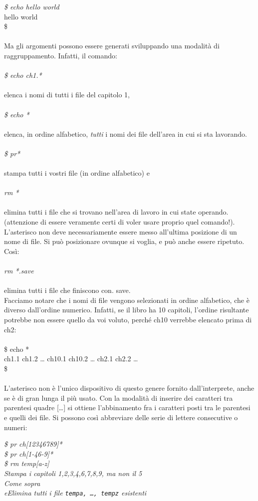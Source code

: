 {\it \$ echo hello world}\\
hello world\\
\$\\\\
Ma gli argomenti possono essere generati sviluppando una modalità di raggruppamento. Infatti, il comando:\\\\
{\it \$ echo ch1.*}\\\\
elenca i nomi di tutti i file del capitolo 1,\\\\
{\it \$ echo *}\\\\
elenca, in ordine alfabetico, {\it tutti} i nomi dei file dell'area in cui si sta lavorando.\\\\
{\it \$ pr*}\\\\
stampa tutti i vostri file (in ordine alfabetico) e\\\\
{\it rm *}\\\\
elimina tutti i file che si trovano nell'area di lavoro in cui state operando. (attenzione
di essere veramente certi di voler usare proprio quel comando!).\\
L'asterisco non deve necessariamente essere messo all'ultima posizione di un nome
di file. Si può posizionare ovunque si voglia, e può anche essere ripetuto. Così:\\\\
{\it rm *.save}\\\\
elimina tutti i file che finiscono con. save.\\
Facciamo notare che i nomi di file vengono selezionati in ordine alfabetico, che è
diverso dall'ordine numerico. Infatti, se il libro ha 10 capitoli, l'ordine risultante potrebbe non essere quello da voi voluto, perché ch10 verrebbe elencato prima di ch2:\\\\
\$ echo *\\
ch1.1 ch1.2 \dots{} ch10.1 ch10.2 \dots{} ch2.1 ch2.2 \dots\\
\$\\\\
L'asterisco non è l'unico dispositivo di questo genere fornito dall'interprete, anche se
è di gran lunga il più usato. Con la modalità di inserire dei caratteri tra parentesi quadre [\dots] si ottiene l'abbinamento fra i caratteri posti tra le parentesi e quelli dei file. Si
possono così abbreviare delle serie di lettere consecutive o numeri:
\begin{multicols}{2}
	{\it \$ pr ch[12346789]*\\ \$ pr ch[1-46-9]*\\ \$ rm temp[a-z]\\ Stampa i capitoli 1,2,3,4,6,7,8,9, ma non il 5\\ Come sopra\\ eElimina tutti i file {\tt tempa, \dots{}, tempz} esistenti}
\end{multicols}

